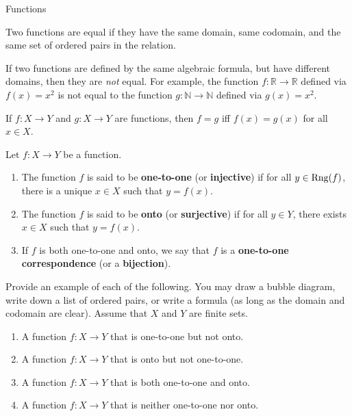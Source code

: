 \begin{section}{Functions}
\begin{definition}
Two functions are equal if they have the same domain, same codomain, and the same set of ordered pairs in the relation.
\end{definition}

\begin{remark}
If two functions are defined by the same algebraic formula, but have different domains, then they are \emph{not} equal.  For example, the function \(f:\mathbb{R}\to \mathbb{R}\) defined via \(f(x)=x^{2}\) is not equal to the function \(g:\mathbb{N}\to\mathbb{N}\) defined via \(g(x)=x^{2}\).
\end{remark}

\begin{theorem}
If \(f:X\to Y\) and \(g:X\to Y\) are functions, then \(f=g\) iff \(f(x)=g(x)\) for all \(x\in X\).
\end{theorem}

\begin{definition}
Let \(f:X\to Y\) be a function.
\begin{enumerate}
\item The function \(f\) is said to be \textbf{one-to-one} (or \textbf{injective}) if for all \(y\in \operatorname{Rng}(f)\), there is a unique \(x\in X\) such that \(y=f(x)\).
\item The function \(f\) is said to be \textbf{onto} (or \textbf{surjective}) if for all \(y\in Y\), there exists \(x\in X\) such that \(y=f(x)\).
\item If \(f\) is both one-to-one and onto, we say that \(f\) is a \textbf{one-to-one correspondence} (or a \textbf{bijection}).
\end{enumerate}
\end{definition}

\begin{exercise}
Provide an example of each of the following.  You may draw a bubble diagram, write down a list of ordered pairs, or write a formula (as long as the domain and codomain are clear).  Assume that \(X\) and \(Y\) are finite sets.
\begin{enumerate}
\item A function \(f:X\to Y\) that is one-to-one but not onto.
\item A function \(f:X\to Y\) that is onto but not one-to-one.
\item A function \(f:X\to Y\) that is both one-to-one and onto.
\item A function \(f:X\to Y\) that is neither one-to-one nor onto.
\end{enumerate}


\end{exercise}
\end{section}
